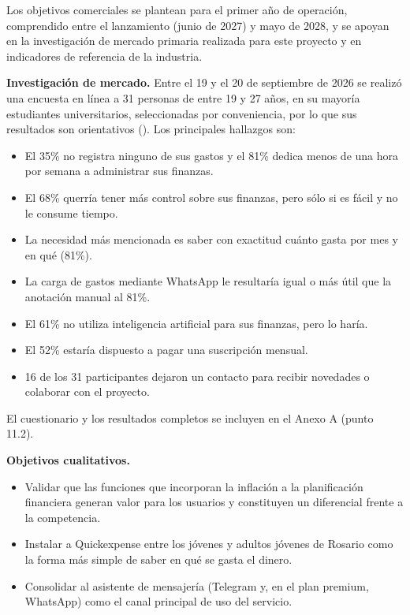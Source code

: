 Los objetivos comerciales se plantean para el primer año de operación,
comprendido entre el lanzamiento (junio de 2027) y mayo de 2028, y se
apoyan en la investigación de mercado primaria realizada para este
proyecto y en indicadores de referencia de la industria.

\textbf{Investigación de mercado.} Entre el 19 y el 20 de septiembre de
2026 se realizó una encuesta en línea a 31 personas de entre 19 y 27
años, en su mayoría estudiantes universitarios, seleccionadas por
conveniencia, por lo que sus resultados son orientativos
(). Los principales
hallazgos son:

\begin{itemize}
\tightlist
\item
  El 35\% no registra ninguno de sus gastos y el 81\% dedica menos de
  una hora por semana a administrar sus finanzas.
\item
  El 68\% querría tener más control sobre sus finanzas, pero sólo si es
  fácil y no le consume tiempo.
\item
  La necesidad más mencionada es saber con exactitud cuánto gasta por
  mes y en qué (81\%).
\item
  La carga de gastos mediante WhatsApp le resultaría igual o más útil
  que la anotación manual al 81\%.
\item
  El 61\% no utiliza inteligencia artificial para sus finanzas, pero lo
  haría.
\item
  El 52\% estaría dispuesto a pagar una suscripción mensual.
\item
  16 de los 31 participantes dejaron un contacto para recibir novedades
  o colaborar con el proyecto.
\end{itemize}

El cuestionario y los resultados completos se incluyen en el Anexo A
(punto 11.2).

\textbf{Objetivos cualitativos.}

\begin{itemize}
\tightlist
\item
  Validar que las funciones que incorporan la inflación a la
  planificación financiera generan valor para los usuarios y constituyen
  un diferencial frente a la competencia.
\item
  Instalar a Quickexpense entre los jóvenes y adultos jóvenes de Rosario
  como la forma más simple de saber en qué se gasta el dinero.
\item
  Consolidar al asistente de mensajería (Telegram y, en el plan premium,
  WhatsApp) como el canal principal de uso del servicio.
\end{itemize}

